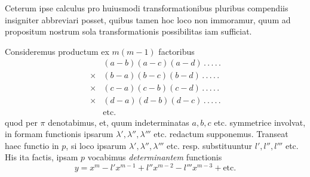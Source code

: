 Ceterum ipse calculus pro huiusmodi transformationibus pluribus compendiis insigniter abbreviari posset, quibus tamen hoc loco non immoramur, quum
ad propositum nostrum sola transformationis possibilitas iam sufficiat.

Consideremus productum ex $m(m-1)$ factoribus
\[
\begin{aligned}
&(a-b)(a-c)(a-d)\, .\, .\, .\, .\, .\\
\times{}&(b-a)(b-c)(b-d)\, .\, .\, .\, .\, .\\
\times{}&(c-a)(c-b)(c-d)\, .\, .\, .\, .\, .\\
\times{}&(d-a)(d-b)(d-c)\, .\, .\, .\, .\, .\\
&\text{etc.}
\end{aligned}
\]
quod per $\pi$ denotabimus, et, quum indeterminatas $a,b,c$ etc. symmetrice involvat, in formam functionis ipsarum $\lambda',\lambda'',\lambda'''$ etc. redactum supponemus. Transeat haec functio in $p$, si loco ipsarum $\lambda',\lambda'',\lambda'''$ etc. resp. substituuntur $l',l'',l'''$ etc.
His ita factis, ipsam $p$ vocabimus \textit{determinantem} functionis
\[
y=x^m-l'x^{m-1}+l''x^{m-2}-l'''x^{m-3}+\text{etc.}
\]
